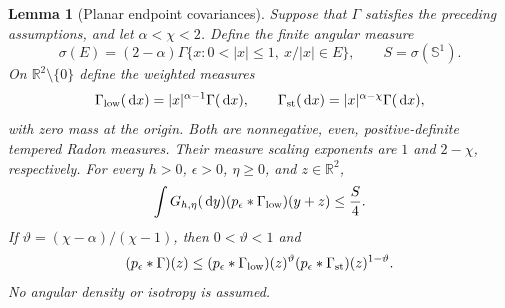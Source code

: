 \documentclass[12pt,oneside,openany]{book}
\numberwithin{equation}{section}
\newtheorem{lemma}[theorem]{Lemma}
\theoremstyle{nogostyle}
\theoremstyle{definition}
\newcommand{\R}{\mathbb{R}}
\newcommand{\ud}{\,\mathrm{d}}
\begin{document}
\begin{lemma}[Planar endpoint covariances]\label{L:planar-endpoints}
  Suppose that $\Gamma$ satisfies the preceding assumptions, and let $\alpha <
  \chi < 2$. Define the finite angular measure
  \[
    \sigma(E)=(2-\alpha)\Gamma
    \{x:0<|x|\le1,\ x/|x|\in E\},\qquad
    S=\sigma(\mathbb{S}^1).
  \]
  On $\R^2\setminus\{0\}$ define the weighted measures
  \begin{equation}\label{E:planar-endpoints}
    \Gamma_{\rm low}(\ud x)=|x|^{\alpha-1}\Gamma(\ud x),\qquad
    \Gamma_{\rm st}(\ud x)=|x|^{\alpha-\chi}\Gamma(\ud x),
  \end{equation}
  with zero mass at the origin. Both are nonnegative, even, positive-definite
  tempered Radon measures. Their measure scaling exponents are $1$ and $2-\chi$,
  respectively. For every $h > 0$, $\epsilon > 0$, $\eta \ge 0$, and $z \in
  \R^2$,
  \begin{equation}\label{E:planar-line-convolution}
    \int G_{h,\eta}(\ud y)(p_\epsilon*\Gamma_{\rm low})(y+z)
    \le\frac S4.
  \end{equation}
  If $\vartheta = (\chi-\alpha)/(\chi-1)$, then $0 < \vartheta < 1$ and
  \begin{equation}\label{E:planar-gaussian-holder}
    (p_\epsilon*\Gamma)(z)
    \le(p_\epsilon*\Gamma_{\rm low})(z)^\vartheta
    (p_\epsilon*\Gamma_{\rm st})(z)^{1-\vartheta}.
  \end{equation}
  No angular density or isotropy is assumed.
\end{lemma}
\end{document}
